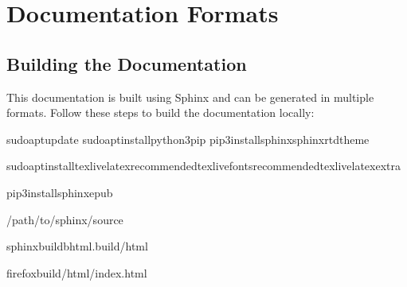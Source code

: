 \documentclass[letterpaper,10pt,english]{sphinxmanual}
\begin{document}
\section{Documentation Formats}
\label{\detokenize{downloads:documentation-formats}}

\subsection{Building the Documentation}
\label{\detokenize{downloads:building-the-documentation}}
\sphinxAtStartPar
This documentation is built using Sphinx and can be generated in multiple formats. Follow these steps to build the documentation locally:

\sphinxAtStartPar
{}

\begin{sphinxVerbatim}[commandchars=\\\{\}]
sudoaptupdate
sudoaptinstallpython3\PYGZhy{}pip
pip3installsphinxsphinx\PYGZhy{}rtd\PYGZhy{}theme

sudoaptinstalltexlive\PYGZhy{}latex\PYGZhy{}recommendedtexlive\PYGZhy{}fonts\PYGZhy{}recommendedtexlive\PYGZhy{}latex\PYGZhy{}extra

pip3installsphinx\PYGZhy{}epub
\end{sphinxVerbatim}

\sphinxAtStartPar
{}

\begin{sphinxVerbatim}[commandchars=\\\{\}]
/path/to/sphinx/source

sphinx\PYGZhy{}build\PYGZhy{}bhtml.\PYGZus{}build/html

firefox\PYGZus{}build/html/index.html
\end{sphinxVerbatim}

\sphinxAtStartPar
{}
\end{document}
